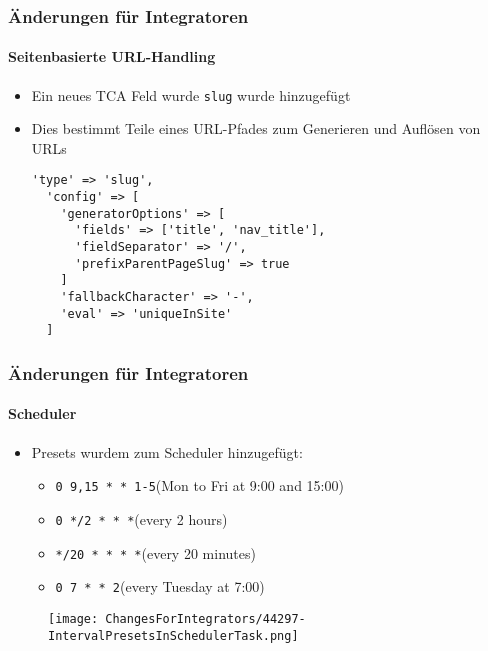 \begin{frame}[fragile]
	\frametitle{Änderungen für Integratoren}
	\framesubtitle{Seitenbasierte URL-Handling}

	\lstset{basicstyle=\smaller\ttfamily}

	\begin{itemize}
		\item Ein neues TCA Feld wurde \texttt{slug} wurde hinzugefügt
		\item Dies bestimmt Teile eines URL-Pfades zum Generieren und Auflösen von URLs

		\begin{lstlisting}
'type' => 'slug',
  'config' => [
    'generatorOptions' => [
      'fields' => ['title', 'nav_title'],
      'fieldSeparator' => '/',
      'prefixParentPageSlug' => true
    ]
    'fallbackCharacter' => '-',
    'eval' => 'uniqueInSite'
  ]
		\end{lstlisting}
	\end{itemize}

\end{frame}


\begin{frame}[fragile]
	\frametitle{Änderungen für Integratoren}
	\framesubtitle{Scheduler}

	\begin{itemize}
		\item Presets wurdem zum Scheduler hinzugefügt:

			\begin{itemize}
				\item \texttt{0 9,15 * * 1-5}\tabto{3.8cm}(Mon to Fri at 9:00 and 15:00)
				\item \texttt{0 */2 * * *}\tabto{3.8cm}(every 2 hours)
				\item \texttt{*/20 * * * *}\tabto{3.8cm}(every 20 minutes)
				\item \texttt{0 7 * * 2}\tabto{3.8cm}(every Tuesday at 7:00)
			\end{itemize}

	\end{itemize}

	\begin{figure}
		\texttt{[image: ChangesForIntegrators/44297-IntervalPresetsInSchedulerTask.png]}
	\end{figure}

\end{frame}


